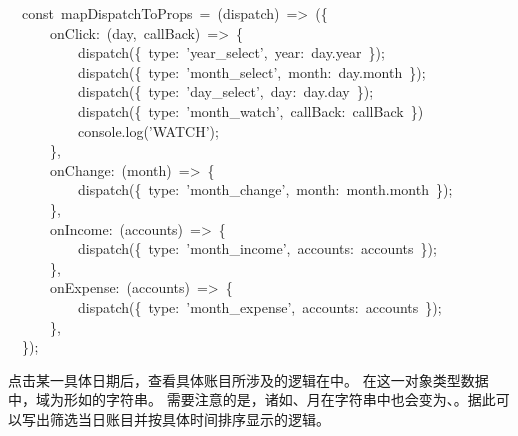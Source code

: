 \documentclass{article}
\begin{document}
\begin{mdpre}%
\noindent~~{const}~mapDispatchToProps~=~(dispatch)~=\textgreater{}~(\{\\
~~~~~~onClick:~(day,~callBack)~=\textgreater{}~\{\\
~~~~~~~~~~dispatch(\{~type:~{'}{year\_select}{'},~year:~day.year~\});\\
~~~~~~~~~~dispatch(\{~type:~{'}{month\_select}{'},~month:~day.month~\});\\
~~~~~~~~~~dispatch(\{~type:~{'}{day\_select}{'},~day:~day.day~\});\\
~~~~~~~~~~dispatch(\{~type:~{'}{month\_watch}{'},~callBack:~callBack~\})\\
~~~~~~~~~~console.log({'}{WATCH}{'});\\
~~~~~~\},\\
~~~~~~onChange:~(month)~=\textgreater{}~\{\\
~~~~~~~~~~dispatch(\{~type:~{'}{month\_change}{'},~month:~month.month~\});\\
~~~~~~\},\\
~~~~~~onIncome:~(accounts)~=\textgreater{}~\{\\
~~~~~~~~~~dispatch(\{~type:~{'}{month\_income}{'},~accounts:~accounts~\});\\
~~~~~~\},\\
~~~~~~onExpense:~(accounts)~=\textgreater{}~\{\\
~~~~~~~~~~dispatch(\{~type:~{'}{month\_expense}{'},~accounts:~accounts~\});\\
~~~~~~\},\\
~~\});%
\end{mdpre}\noindent{}点击某一具体日期后，查看具体账目所涉及的逻辑在中。
在这一对象类型数据中，域为形如的字符串。
需要注意的是，诸如、月在字符串中也会变为、。据此可以写出筛选当日账目并按具体时间排序显示的逻辑。
\end{document}
